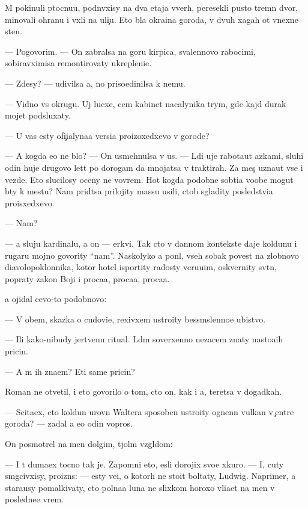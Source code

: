 \documentclass[10pt]{book}
\begin{document}
M{\yi} pokinuli p{\yi}tocnu{\y}u, podn{\ia}vxisy na dva etaja vverh, peresekli pusto{\y} t{\io}rem\-n{\yi}{\y} dvor, minovali ohranu i v{\yi}xli na uli{\c}u. Eto b{\yi}la okra{\y}ina go\-ro\-da, v dvuh xagah ot vnexne{\y} sten{\yi}.

— Pogovorim. — On zabralsa na goru kirpica, svalennovo rabocimi, sobiravximisa remontirovaty ukrepleni{\y}e.

— Zdesy? — udivilsa {\y}a, no priso{\y}edinilsa k nemu.

— Vidno vs{\io} okrugu. Uj lucxe, cem kabinet nacalynika t{\io}rym{\yi}, gde kajd{\yi}{\y} durak mojet podsluxaty.

— U vas {\y}esty ofi{\c}ialyna{\y}a versi{\y}a proizoxedxevo v gorode?

— A kogda {\y}e{\y}o ne b{\yi}lo? — On usmehnulsa v us{\yi}. — L{\io}di uje rabota{\y}ut {\y}a\-z{\yi}\-ka\-mi, sluhi odin huje drugovo let{\ia}t po dorogam da mnojatsa v traktirah. Za mes{\ia}{\c} uzna{\y}ut vse i vezde. Eto slucilosy oceny ne vovrem{\ia}. Hot{\ia} kogda podobn{\yi}{\y}e sob{\yi}ti{\y}a voob{\x}e mogut b{\yi}ty k mestu? Nam prid{\e}tsa prilojity massu usili{\y}, ctob{\yi} sgladity posledstvi{\y}a proisxedxevo.

— Nam?

— {\Y}a sluju kardinalu, a on — {\C}erkvi. Tak cto v dannom kontekste daje koldunu i rugaru mojno govority ``nam''. Naskolyko {\y}a pon{\ia}l, vseh sobak poves{\ia}t na zlobnovo diavolopoklonnika, kotor{\yi}{\y} hotel isportity radosty veru{\y}u{\x}im, oskvernity sv{\ia}t{\yi}n{\io}, popraty zakon{\yi} Boj{\y}i i proca{\y}a, proca{\y}a, proca{\y}a.

{\Y}a ojidal cevo-to podobnovo:

— V ob{\x}em, skazka o cudovi{\x}e, rexivxem ustro{\y}ity bessm{\yi}slenno{\y}e ubi{\y}stvo.

— Ili kako{\y}-nibudy jertvenn{\yi}{\y} ritual. L{\io}d{\ia}m soverxenno nezacem znaty nasto{\y}a{\x}ih pricin.

— A m{\yi} ih zna{\y}em? Eti sam{\yi}{\y}e pricin{\yi}?

Roman ne otvetil, i eto govorilo o tom, cto on, kak i {\y}a, ter{\ia}{\y}etsa v dogadkah.

— Scita{\y}ex, cto koldun urovn{\ia} Waltera sposoben ustro{\y}ity ognen\-n{\yi}{\y} vulkan v {\c}entre go\-ro\-da? — zadal {\y}a {\y}e{\x}o odin vopros.

On posmotrel na men{\ia} dolgim, t{\ia}jol{\yi}m vzgl{\ia}dom:

— I t{\yi} duma{\y}ex tocno tak je. Zapomni eto, {\y}esli dorojix svo{\y}e{\y} xkuro{\y}. — I, cuty sm{\ia}gcivxisy, proizn{\e}s: — {\Y}esty ve{\x}i, o kotor{\yi}h ne stoit boltaty, Ludwig. Naprimer, {\y}a stara{\y}usy pomalkivaty, cto polna{\y}a luna ne slixkom horoxo vli{\y}a{\y}et na men{\ia} v posledne{\y}e vrem{\ia}.
\end{document}
